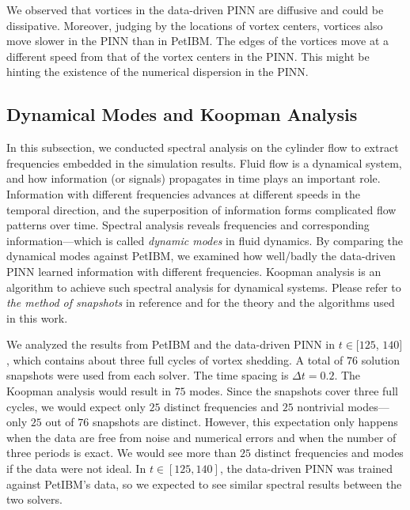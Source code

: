 We observed that vortices in the data-driven PINN are diffusive and could be dissipative.
Moreover, judging by the locations of vortex centers, vortices also move slower in the PINN than in PetIBM.
The edges of the vortices move at a different speed from that of the vortex centers in the PINN.
This might be hinting the existence of the numerical dispersion in the PINN.

\subsection{Dynamical Modes and Koopman Analysis}

In this subsection, we conducted spectral analysis on the cylinder flow to extract frequencies embedded in the simulation results.
Fluid flow is a dynamical system, and how information (or signals) propagates in time plays an important role.
Information with different frequencies advances at different speeds in the temporal direction, and the superposition of information forms complicated flow patterns over time.
Spectral analysis reveals frequencies and corresponding information---which is called {\it dynamic modes} in fluid dynamics.
By comparing the dynamical modes against PetIBM, we examined how well/badly the data-driven PINN learned information with different frequencies.
Koopman analysis is an algorithm to achieve such spectral analysis for dynamical systems.
Please refer to {\it the method of snapshots} in reference \cite{chen_variants_2012} and \cite{rowley_spectral_2009} for the theory and the algorithms used in this work.

We analyzed the results from PetIBM and the data-driven PINN in $t\in$$[125$, $140]$, which contains about three full cycles of vortex shedding.
A total of $76$ solution snapshots were used from each solver.
The time spacing is $\Delta t = 0.2$.
The Koopman analysis would result in $75$ modes.
Since the snapshots cover three full cycles, we would expect only $25$ distinct frequencies and $25$ nontrivial modes---only $25$ out of $76$ snapshots are distinct.
However, this expectation only happens when the data are free from noise and numerical errors and when the number of three periods is exact.
We would see more than $25$ distinct frequencies and modes if the data were not ideal.
In $t \in [125, 140]$, the data-driven PINN was trained against PetIBM's data, so we expected to see similar spectral results between the two solvers.

